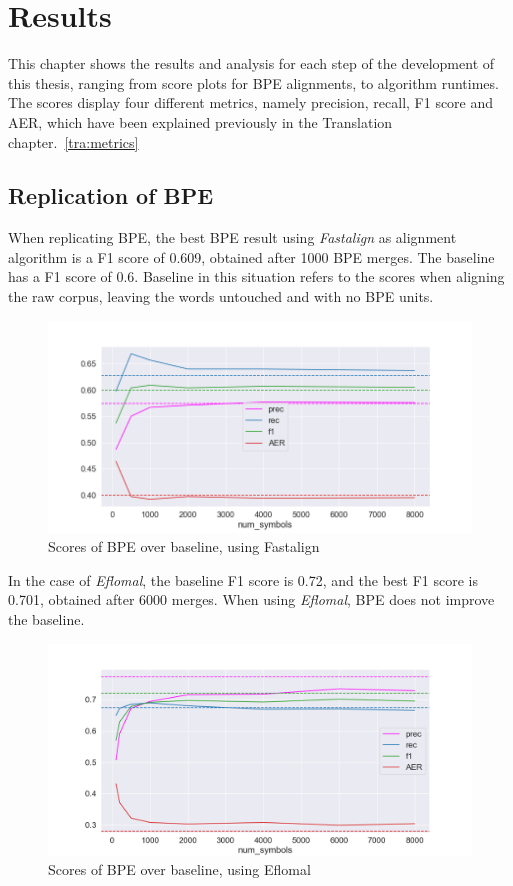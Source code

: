%
%

\chapter{Results}\label{ch:results}

This chapter shows the results and analysis for each step of the development of this thesis, ranging from score plots for BPE alignments, to algorithm runtimes. The scores display four different metrics, namely precision, recall, F1 score and AER, which have been explained previously in the Translation chapter.~\ref{tra:metrics}

\section{Replication of BPE}

When replicating BPE, the best BPE result using \emph{Fastalign} as alignment algorithm is a F1 score of 0.609, obtained after 1000 BPE merges. The baseline has a F1 score of 0.6. Baseline in this situation refers to the scores when aligning the raw corpus, leaving the words untouched and with no BPE units.

\begin{figure}[!ht]
    \centering
    \includegraphics[width=12cm]{../reports/scores_normal_bpe/eng_deu_fastalign.png}
    \caption{Scores of BPE over baseline, using Fastalign}
\end{figure}

In the case of \emph{Eflomal}, the baseline F1 score is 0.72, and the best F1 score is 0.701, obtained after 6000 merges. When using \emph{Eflomal}, BPE does not improve the baseline.

\begin{figure}[!ht]
    \centering
    \includegraphics[width=12cm]{../reports/scores_normal_bpe/eng_deu_eflomal.png}
    \caption{Scores of BPE over baseline, using Eflomal}
\end{figure}

